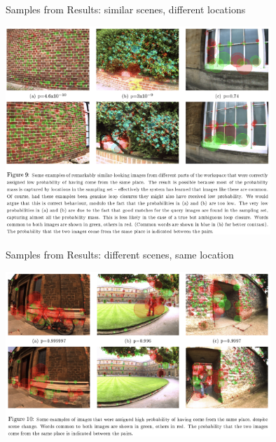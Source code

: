 \documentclass[dvipsnames, handout]{beamer}
\newcommand{\1}{\mathds{1}}	%
\begin{document}
\begin{frame}[t]{Samples from Results: similar scenes, different locations}
\begin{center}
\includegraphics[width=0.75\textwidth]{imgs/fig9.png}
\end{center}
\end{frame}

\begin{frame}[t]{Samples from Results: different scenes, same location}
\begin{center}
\includegraphics[width=0.75\textwidth]{imgs/fig10.png}
\end{center}
\end{frame}
\end{document}
